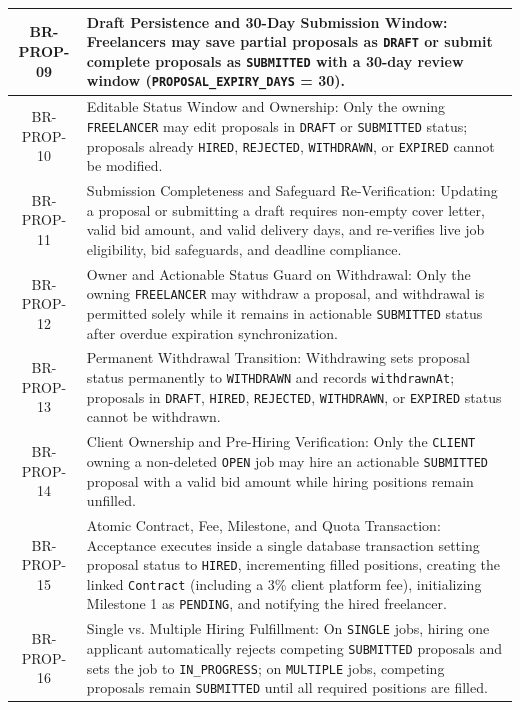 \begin{longtable}{|c|p{12cm}|}
    BR-PROP-09 & Draft Persistence and 30-Day Submission Window: Freelancers may save partial proposals as \texttt{DRAFT} or submit complete proposals as \texttt{SUBMITTED} with a 30-day review window (\texttt{PROPOSAL\_EXPIRY\_DAYS} = 30). \\ \hline
    BR-PROP-10 & Editable Status Window and Ownership: Only the owning \texttt{FREELANCER} may edit proposals in \texttt{DRAFT} or \texttt{SUBMITTED} status; proposals already \texttt{HIRED}, \texttt{REJECTED}, \texttt{WITHDRAWN}, or \texttt{EXPIRED} cannot be modified. \\ \hline
    BR-PROP-11 & Submission Completeness and Safeguard Re-Verification: Updating a proposal or submitting a draft requires non-empty cover letter, valid bid amount, and valid delivery days, and re-verifies live job eligibility, bid safeguards, and deadline compliance. \\ \hline
    BR-PROP-12 & Owner and Actionable Status Guard on Withdrawal: Only the owning \texttt{FREELANCER} may withdraw a proposal, and withdrawal is permitted solely while it remains in actionable \texttt{SUBMITTED} status after overdue expiration synchronization. \\ \hline
    BR-PROP-13 & Permanent Withdrawal Transition: Withdrawing sets proposal status permanently to \texttt{WITHDRAWN} and records \texttt{withdrawnAt}; proposals in \texttt{DRAFT}, \texttt{HIRED}, \texttt{REJECTED}, \texttt{WITHDRAWN}, or \texttt{EXPIRED} status cannot be withdrawn. \\ \hline
    BR-PROP-14 & Client Ownership and Pre-Hiring Verification: Only the \texttt{CLIENT} owning a non-deleted \texttt{OPEN} job may hire an actionable \texttt{SUBMITTED} proposal with a valid bid amount while hiring positions remain unfilled. \\ \hline
    BR-PROP-15 & Atomic Contract, Fee, Milestone, and Quota Transaction: Acceptance executes inside a single database transaction setting proposal status to \texttt{HIRED}, incrementing filled positions, creating the linked \texttt{Contract} (including a 3\% client platform fee), initializing Milestone 1 as \texttt{PENDING}, and notifying the hired freelancer. \\ \hline
    BR-PROP-16 & Single vs. Multiple Hiring Fulfillment: On \texttt{SINGLE} jobs, hiring one applicant automatically rejects competing \texttt{SUBMITTED} proposals and sets the job to \texttt{IN\_PROGRESS}; on \texttt{MULTIPLE} jobs, competing proposals remain \texttt{SUBMITTED} until all required positions are filled. \\ \hline

\end{longtable}
